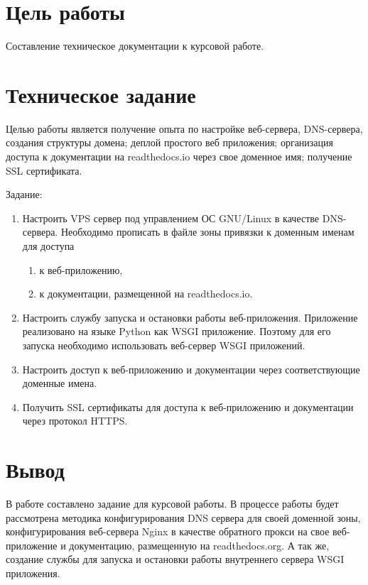 \documentclass[12pt,a4paper]{article}
\begin{document}
\makeqtitle
\setcounter{page}{2}

\section{Цель работы}

Составление техническое документации к курсовой работе.

\section{Техническое задание}

Целью работы является получение опыта по настройке веб-сервера, DNS-сервера, создания структуры домена;
деплой простого веб приложения; организация доступа к документации на readthedocs.io через
свое доменное имя; получение SSL сертификата.

Задание:

\begin{enumerate}
    \item Настроить VPS сервер под управлением ОС GNU/Linux в качестве DNS-сервера.
          Необходимо прописать в файле зоны привязки к доменным именам для доступа
        \begin{enumerate}
            \item к веб-приложению,
            \item к документации, размещенной на readthedocs.io.
        \end{enumerate}
    \item Настроить службу запуска и остановки работы веб-приложения.
          Приложение реализовано на языке Python как WSGI приложение. Поэтому для его запуска
          необходимо использовать веб-сервер WSGI приложений.
    \item Настроить доступ к веб-приложению и документации через соответствующие доменные имена.
    \item Получить SSL сертификаты для доступа к веб-приложению и документации через протокол HTTPS.
\end{enumerate}

\section{Вывод}

В работе составлено задание для курсовой работы. В процессе работы
будет рассмотрена методика конфигурирования DNS сервера для своей
доменной зоны, конфигурирования веб-сервера Nginx в качестве обратного
прокси на свое веб-приложение и документацию, размещенную на readthedocs.org.
А так же, создание службы для запуска и остановки работы внутреннего
сервера WSGI приложения.
\end{document}
